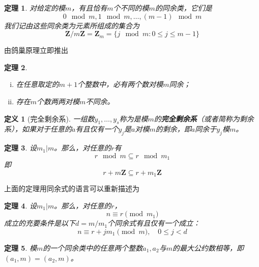 \documentclass{ctexrep}
\newcommand{\bbold}[1]{\textbf{#1}}
\newcommand{\Z}{\boldsymbol{Z}}
\newtheorem{thrm}{定理}[section]
\newtheorem{defn}{定义}[section]
\begin{document}
\begin{thrm}
对给定的模$m$，有且恰有$m$个不同的模$m$的同余类，它们是
\begin{equation}
0\mod m,1\mod m,\dotsc,(m-1)\mod m
\end{equation}
我们记由这些同余类为元素所组成的集合为
\begin{equation}
\Z/m\Z=\Z_m=\{j\mod m:0\leq j\leq m-1\}
\end{equation}
\end{thrm}

由鸽巢原理立即推出

\begin{thrm}
\begin{enumerate}[(i)]
\item 在任意取定的$m+1$个整数中，必有两个数对模$m$同余；
\item 存在$m$个数两两对模$m$不同余。
\end{enumerate}
\end{thrm}

\begin{defn}[完全剩余系]
一组数$y_1,\dotsc,y_s$称为是模$m$的\bbold{完全剩余系}（或者简称为剩余系），如果对于任意的$a$有且仅有一个$y_j$是$a$对模$m$的剩余，即$a$同余于$y_j$模$m$。
\end{defn}

\begin{thrm}
设$m_1|m$。那么，对任意的$r$有
\begin{displaymath}
r\mod m \subseteq r\mod m_1
\end{displaymath}
即
\begin{displaymath}
r+m\Z \subseteq r+m_1\Z
\end{displaymath}
\end{thrm}

上面的定理用同余式的语言可以重新描述为

\begin{thrm}
设$m_1|m$。那么，对任意的$r$，
\begin{displaymath}
n\equiv r\pmod{m_1}
\end{displaymath}
成立的充要条件是以下$d=m/m_1$个同余式有且仅有一个成立：
\begin{displaymath}
n\equiv r+jm_1\pmod{m},\quad 0\leq j<d
\end{displaymath}
\end{thrm}

\begin{thrm}
模$m$的一个同余类中的任意两个整数$a_1,a_2$与$m$的最大公约数相等，即$(a_1,m)=(a_2,m)$。
\end{thrm}
\end{document}
